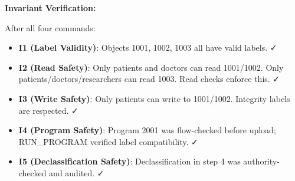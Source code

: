 \textbf{Invariant Verification:}

After all four commands:
\begin{itemize}
    \item \textbf{I1 (Label Validity)}: Objects 1001, 1002, 1003 all have valid labels. ✓
    \item \textbf{I2 (Read Safety)}: Only patients and doctors can read 1001/1002. Only patients/doctors/researchers can read 1003. Read checks enforce this. ✓
    \item \textbf{I3 (Write Safety)}: Only patients can write to 1001/1002. Integrity labels are respected. ✓
    \item \textbf{I4 (Program Safety)}: Program 2001 was flow-checked before upload; RUN\_PROGRAM verified label compatibility. ✓
    \item \textbf{I5 (Declassification Safety)}: Declassification in step 4 was authority-checked and audited. ✓
\end{itemize}
